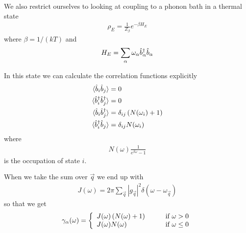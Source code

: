 We also restrict ourselves to looking at coupling to a phonon bath in a thermal state
\begin{align}
  \rho_E = \frac{1}{Z_\beta} e^{-\beta H_E}
\end{align}
where $\beta = 1/(kT)$ and
\begin{align}
  H_E = \sum_\alpha \omega_\alpha \hat{b}^\dagger_\alpha \hat{b}_\alpha
\end{align}

In this state we can calculate the correlation functions explicitly
\begin{align}
  \langle \hat{b}_i \hat{b}_j \rangle &= 0 \\
  \langle \hat{b}^\dagger_i \hat{b}^\dagger_j \rangle &= 0 \\
  \langle \hat{b}_i \hat{b}^\dagger_j \rangle &= \delta_{ij} \left( N(\omega_i) +1 \right) \\
  \langle \hat{b}^\dagger_i \hat{b}_j \rangle &= \delta_{ij} N(\omega_i)
\end{align}
where
\begin{align}
  N(\omega) \frac{1}{e^{\beta \omega} - 1}
\end{align}
is the occupation of state $i$.

When we take the sum over $\vec{q}$ we end up with 
\begin{align}
  J(\omega) = 2\pi \sum_\vec{q} |g_\vec{q}|^2 \delta(\omega-\omega_\vec{q})
\end{align}
so that we get
\begin{align}
  \gamma_\alpha(\omega) = \left\{
    \begin{array}{l l}
    J(\omega)\left(N(\omega) + 1\right) & \qquad \text{if $\omega > 0$}\\
    J(\omega)N(\omega) & \qquad \text{if $\omega \leq 0$}
  \end{array} \right.
\end{align}

